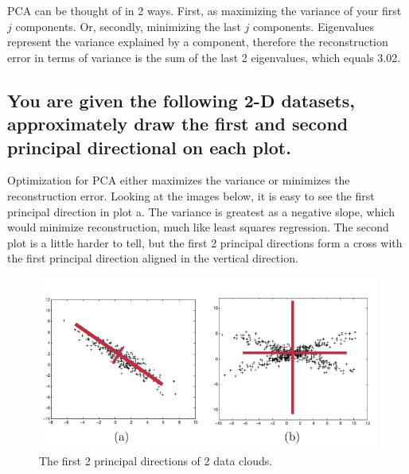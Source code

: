 \documentclass[a4paper]{article}
\begin{document}
PCA can be thought of in 2 ways.  First, as maximizing the variance of your first $j$ components.  Or, secondly, minimizing the last $j$ components.  Eigenvalues represent the variance explained by a component, therefore the reconstruction error in terms of variance is the sum of the last 2 eigenvalues, which equals 3.02.

\newpage
\subsection{You are given the following 2-D datasets, approximately draw the first and second
principal directional on each plot.}


Optimization for PCA either maximizes the variance or minimizes the reconstruction error.  Looking at the images below, it is easy to see the first principal direction in plot a.  The variance is greatest as a negative slope, which would minimize reconstruction, much like least squares regression.  The second plot is a little harder to tell, but the first 2 principal directions form a cross with the first principal direction aligned in the vertical direction.

 

\begin{figure}[h]
    \centering
		\includegraphics[width=\textwidth]{pca_clouds.png}
        \caption{The first 2 principal directions of 2 data clouds.}
\end{figure}



\end{document}
